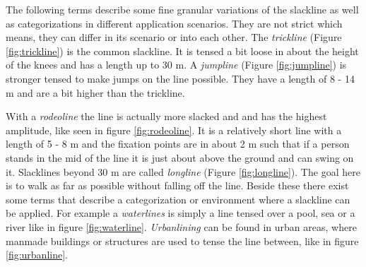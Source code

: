 The following terms describe some fine granular variations of the slackline as well as categorizations in different application scenarios. They are not strict which means, they can differ in its scenario or  into each other. The \textit{trickline} (Figure \ref{fig:trickline}) is the common slackline. It is tensed a bit loose in about the height of the knees and has a length up to 30 m. A \textit{jumpline} (Figure \ref{fig:jumpline}) is stronger tensed to make jumps on the line possible. They have a length of 8 - 14 m and are a bit higher than the trickline. 

With a \textit{rodeoline} the line is actually more slacked and and has the highest amplitude, like seen in figure \ref{fig:rodeoline}. It is a relatively short line with a length of 5 - 8 m and the fixation points are in about 2 m such that if a person stands in the mid of the line it is just about above the ground and can swing on it. Slacklines beyond 30 m are called \textit{longline} (Figure \ref{fig:longline}). The goal here is to walk as far as possible without falling off the line. Beside these there exist some terms that describe a categorization or environment where a slackline can be applied. For example a \textit{waterlines} is simply a line tensed over a pool, sea or a river like in figure \ref{fig:waterline}. \textit{Urbanlining} can be found in urban areas, where manmade buildings or structures are used to tense the line between, like in figure \ref{fig:urbanline}.
